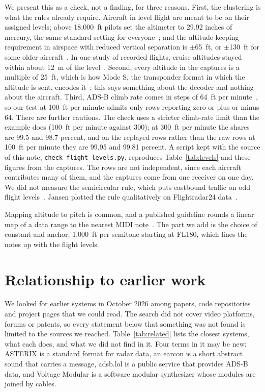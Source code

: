\documentclass[11pt,letterpaper]{article}
\begin{document}
We present this as a check, not a finding, for three reasons. First, the clustering is what the rules already require. Aircraft in level flight are meant to be on their assigned levels; above 18,000~ft pilots set the altimeter to 29.92 inches of mercury, the same standard setting for everyone~\cite{cfr2026s91121}; and the altitude-keeping requirement in airspace with reduced vertical separation is $\pm$65~ft, or $\pm$130~ft for some older aircraft~\cite{cfr2026appg}. In one study of recorded flights, cruise altitudes stayed within about 12~m of the level~\cite{chen2014relative}. Second, every altitude in the captures is a multiple of 25~ft, which is how Mode S, the transponder format in which the altitude is sent, encodes it~\cite{sun2021riddle}; this says something about the decoder and nothing about the aircraft. Third, ADS-B climb rate comes in steps of 64~ft per minute~\cite{wiedehopf2026readsb}, so our test at 100~ft per minute admits only rows reporting zero or plus or minus 64. There are further cautions. The check uses a stricter climb-rate limit than the example does (100~ft per minute against 300); at 300~ft per minute the shares are 99.5 and 98.7 percent, and on the replayed rows rather than the raw rows at 100~ft per minute they are 99.95 and 99.81 percent. A script kept with the source of this note, \texttt{check\_flight\_levels.py}, reproduces Table~\ref{tab:levels} and these figures from the captures. The rows are not independent, since each aircraft contributes many of them, and the captures come from one receiver on one day. We did not measure the semicircular rule, which puts eastbound traffic on odd flight levels~\cite{cfr2026s91179}. Jansen plotted the rule qualitatively on Flightradar24 data~\cite{jansen2020flightradar24}.

Mapping altitude to pitch is common, and a published guideline rounds a linear map of a data range to the nearest MIDI note~\cite{brown2003guidelines,dubus2013mapping}. The part we add is the choice of constant and anchor, 1,000~ft per semitone starting at FL180, which lines the notes up with the flight levels.

\section{Relationship to earlier work}\label{sec:related}

We looked for earlier systems in October 2026 among papers, code repositories and project pages that we could read. The search did not cover video platforms, forums or patents, so every statement below that something was not found is limited to the sources we reached. Table~\ref{tab:related} lists the closest systems, what each does, and what we did not find in it. Four terms in it may be new: ASTERIX is a standard format for radar data, an earcon is a short abstract sound that carries a message, adsb.lol is a public service that provides ADS-B data, and Voltage Modular is a software modular synthesizer whose modules are joined by cables.
\end{document}

